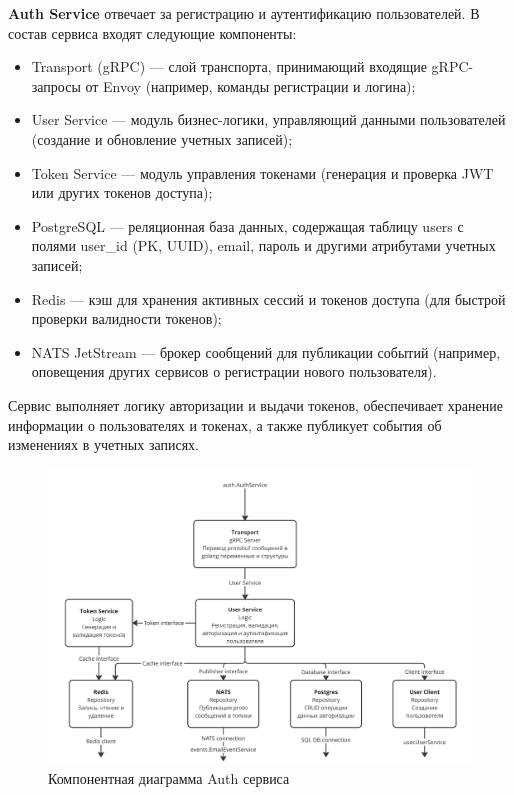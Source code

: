 \textbf{Auth Service} отвечает за регистрацию и аутентификацию пользователей. В состав сервиса входят следующие компоненты:
\begin{itemize}
    \item Transport (gRPC) — слой транспорта, принимающий входящие gRPC-запросы от Envoy (например, команды регистрации и логина);
    \item User Service — модуль бизнес-логики, управляющий данными пользователей (создание и обновление учетных записей);
    \item Token Service — модуль управления токенами (генерация и проверка JWT или других токенов доступа);
    \item PostgreSQL — реляционная база данных, содержащая таблицу users с полями user\_id (PK, UUID), email, пароль и другими атрибутами учетных записей;
    \item Redis — кэш для хранения активных сессий и токенов доступа (для быстрой проверки валидности токенов);
    \item NATS JetStream — брокер сообщений для публикации событий (например, оповещения других сервисов о регистрации нового пользователя).
\end{itemize}
Сервис выполняет логику авторизации и выдачи токенов, обеспечивает хранение информации о пользователях и токенах, а также публикует события об изменениях в учетных записях.
\begin{figure}[H]
        \centering
        \includegraphics[width=0.8\linewidth]{Images/second_chapter_backend_architecture/Picture3.png}
        \caption{Компонентная диаграмма Auth сервиса}
        \label{fig:auth-service-component-diagram}
\end{figure}

